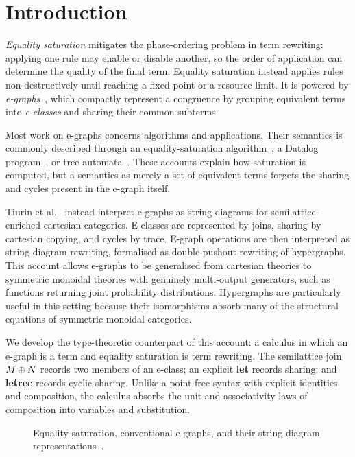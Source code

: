 \section{Introduction}
\label{sec:introduction}

\emph{Equality saturation} mitigates the phase-ordering problem in term
rewriting: applying one rule may enable or disable another, so the order of
application can determine the quality of the final term.  Equality saturation
instead applies rules non-destructively until reaching a fixed point or a
resource limit.  It is powered by \emph{e-graphs}~\cite{nelson1980techniques},
which compactly represent a congruence by grouping equivalent terms into
\emph{e-classes} and sharing their common subterms.

Most work on e-graphs concerns algorithms and applications.  Their semantics
is commonly described through an equality-saturation algorithm~\cite{EggPaper},
a Datalog program~\cite{zhang_relational_2022}, or tree
automata~\cite{tree_automata_e_graphs}.  These accounts explain how saturation
is computed, but a semantics as merely a set of equivalent terms forgets the
sharing and cycles present in the e-graph itself.

Tiurin et al.~\cite{tiurin2025equivalencehypergraphsdporewriting} instead
interpret e-graphs as string diagrams for semilattice-enriched cartesian
categories.  E-classes are represented by joins, sharing by cartesian copying,
and cycles by trace.  
E-graph operations are then interpreted as string-diagram rewriting,
formalised as double-pushout rewriting of hypergraphs.  This account allows
e-graphs to be generalised from cartesian theories to symmetric monoidal
theories with genuinely multi-output generators, such as functions returning
joint probability distributions.  Hypergraphs are particularly useful in
this setting because their isomorphisms absorb many of the structural
equations of symmetric monoidal categories.

We develop the type-theoretic counterpart of this account: a calculus in which
an e-graph is a term and equality saturation is term rewriting.  The
semilattice join $M\mathbin{\oplus} N$ records two members of an e-class; an explicit
\textbf{let} records sharing; and \textbf{letrec} records cyclic sharing.
Unlike a point-free syntax with explicit identities and composition, the
calculus absorbs the unit and associativity laws of composition into variables
and substitution. 

\begin{figure}[t]
  \centering
  \caption{Equality saturation, conventional e-graphs, and their
    string-diagram representations~\cite[Fig.~1]{tiurin2025equivalencehypergraphsdporewriting}.}
  \label{fig:e-graph-example}
\end{figure}

